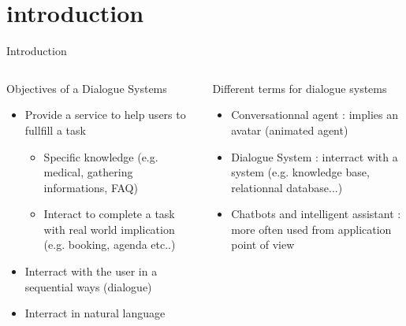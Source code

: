 \documentclass[10pt,aspectratio=169]{beamer}
\begin{document}
\section{introduction}
\begin{frame}{Introduction}
    \begin{columns}
        \begin{column}{0.5\textwidth}
            \begin{block}{Objectives of a Dialogue Systems}
                \begin{itemize}
                    \item Provide a service to help users to fullfill a task 
                        \begin{itemize}
                            \item Specific knowledge (e.g. medical, gathering informations, FAQ)
                            \item Interact to complete a task with real world implication (e.g. booking, agenda etc..)
                        \end{itemize}
                    \item Interract with the user in a sequential ways (dialogue)
                    \item Interract in natural language
                 \end{itemize}
            \end{block}
        \end{column}
        \begin{column}{0.5\textwidth}
            \begin{block}{Different terms  for dialogue systems}
                \begin{itemize}
                    \item Conversationnal agent : implies an avatar (animated agent)
                    \item Dialogue System : interract with a system  (e.g. knowledge base, relationnal database...)
                    \item Chatbots and intelligent assistant : more often used from application point of view
                \end{itemize}
            \end{block}
        \end{column}
    \end{columns}
\end{frame}
\end{document}
